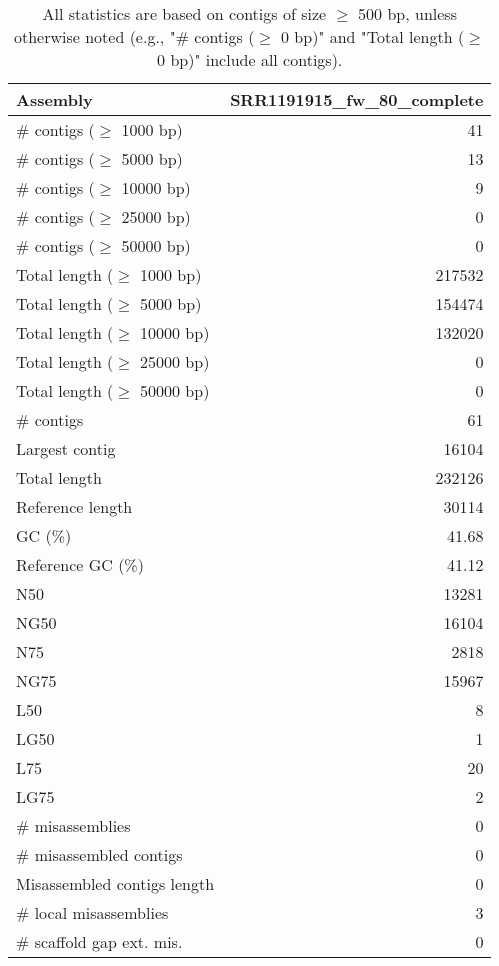 \documentclass[12pt,a4paper]{article}
\begin{document}
\begin{table}[ht]
\begin{center}
\caption{All statistics are based on contigs of size $\geq$ 500 bp, unless otherwise noted (e.g., "\# contigs ($\geq$ 0 bp)" and "Total length ($\geq$ 0 bp)" include all contigs).}
\begin{tabular}{|l*{1}{|r}|}
\hline
Assembly & SRR1191915\_fw\_80\_complete \\ \hline
\# contigs ($\geq$ 1000 bp) & 41 \\ \hline
\# contigs ($\geq$ 5000 bp) & 13 \\ \hline
\# contigs ($\geq$ 10000 bp) & 9 \\ \hline
\# contigs ($\geq$ 25000 bp) & 0 \\ \hline
\# contigs ($\geq$ 50000 bp) & 0 \\ \hline
Total length ($\geq$ 1000 bp) & 217532 \\ \hline
Total length ($\geq$ 5000 bp) & 154474 \\ \hline
Total length ($\geq$ 10000 bp) & 132020 \\ \hline
Total length ($\geq$ 25000 bp) & 0 \\ \hline
Total length ($\geq$ 50000 bp) & 0 \\ \hline
\# contigs & 61 \\ \hline
Largest contig & 16104 \\ \hline
Total length & 232126 \\ \hline
Reference length & 30114 \\ \hline
GC (\%) & 41.68 \\ \hline
Reference GC (\%) & 41.12 \\ \hline
N50 & 13281 \\ \hline
NG50 & 16104 \\ \hline
N75 & 2818 \\ \hline
NG75 & 15967 \\ \hline
L50 & 8 \\ \hline
LG50 & 1 \\ \hline
L75 & 20 \\ \hline
LG75 & 2 \\ \hline
\# misassemblies & 0 \\ \hline
\# misassembled contigs & 0 \\ \hline
Misassembled contigs length & 0 \\ \hline
\# local misassemblies & 3 \\ \hline
\# scaffold gap ext. mis. & 0 \\ \hline

\end{tabular}
\end{center}
\end{table}
\end{document}
